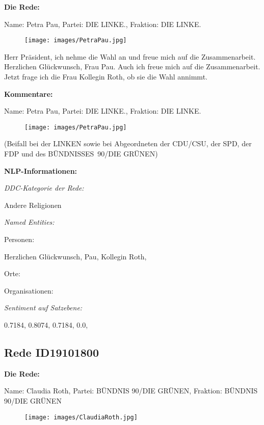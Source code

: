 \documentclass[10pt, a4paper]{report}
\begin{document}
\textbf{Die Rede:}

Name: Petra Pau, Partei: DIE LINKE., Fraktion: DIE LINKE.

\begin{figure}[!ht]
\texttt{[image: images/PetraPau.jpg]}
\end{figure}


Herr Präsident, ich nehme die Wahl an und freue mich auf die Zusammenarbeit. Herzlichen Glückwunsch, Frau Pau. Auch ich freue mich auf die Zusammenarbeit. Jetzt frage ich die Frau Kollegin Roth, ob sie die Wahl annimmt. 

\textbf{Kommentare:}

Name: Petra Pau, Partei: DIE LINKE., Fraktion: DIE LINKE.

\begin{figure}[!ht]
\texttt{[image: images/PetraPau.jpg]}
\end{figure}


(Beifall bei der LINKEN sowie bei Abgeordneten der CDU/CSU, der SPD, der FDP und des BÜNDNISSES 90/DIE GRÜNEN)


\textbf{NLP-Informationen:}

\textit{DDC-Kategorie der Rede:}

Andere Religionen

\textit{Named Entities:}

Personen:

Herzlichen Glückwunsch, Pau, Kollegin Roth, 

Orte:



Organisationen:



\textit{Sentiment auf Satzebene:}

0.7184, 0.8074, 0.7184, 0.0, 
\subsection{Rede ID19101800}

\textbf{Die Rede:}

Name: Claudia Roth, Partei: BÜNDNIS 90/DIE GRÜNEN, Fraktion: BÜNDNIS 90/DIE GRÜNEN

\begin{figure}[!ht]
\texttt{[image: images/ClaudiaRoth.jpg]}
\end{figure}
\end{document}
